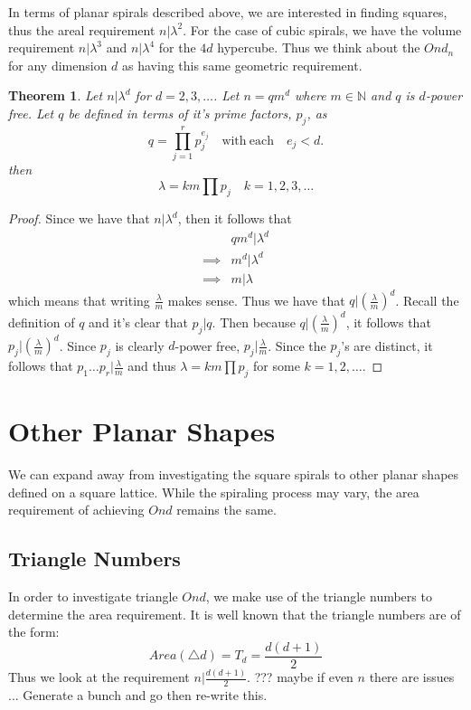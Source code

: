 \documentclass[11pt,reqno]{amsart}
\theoremstyle{mydef}
\newtheorem{thm}{Theorem}[section]
\begin{document}
In terms of planar spirals described above, we are interested
in finding squares, thus the areal requirement $n \vert \lambda^2$. For the case
of cubic spirals, we have the volume requirement $n \vert \lambda^3$ and $n 
\vert \lambda^4$ for the $4d$ hypercube. Thus we think about the $Ond_n$ for any 
dimension $d$ as having this same geometric requirement.

\begin{thm}
\label{dimdthm}
Let $n\vert \lambda^d$ for $d=2, 3, \ldots$. Let $n = qm^d$ where $m \in \mathbb{N}$ and $q$ is $d$-power 
free. Let $q$ be defined in terms of it's prime factors, $p_j$, as
\[
	q = \prod\limits_{j=1}^{r} p_j^{e_j}\quad \text{with}\ \text{each}\quad e_j < d.
\]
then
\[
	\lambda = k m \prod p_j \quad k = 1, 2, 3, \ldots
\]
\end{thm}

\begin{proof}
Since we have that $n \vert \lambda^d$, then it follows that
\begin{align*}
  & qm^d \vert \lambda^d\\
\implies & m^d \vert \lambda^d\\
\implies & m \vert \lambda 
\end{align*}
which means that writing $\frac{\lambda}{m}$ makes sense. Thus we have 
that $q \vert (\frac{\lambda}{m})^d$. Recall the definition of $q$ and it's clear
that $p_j \vert q$. Then because $q \vert (\frac{\lambda}{m})^d$, it follows that
$p_j \vert (\frac{\lambda}{m})^d$.  Since $p_j$ is clearly $d$-power free, $p_j \vert \frac{\lambda}{m}$.
Since the $p_j$'s are distinct, it follows that $p_1 \dots p_r \vert \frac{\lambda}{m}$ 
and thus $\lambda = k m \prod p_j$ for some $k = 1, 2, \ldots$.
\end{proof}

\section{Other Planar Shapes}

We can expand away from investigating the square spirals to other planar shapes
defined on a square lattice. While the spiraling process may vary, the area
requirement of achieving $Ond$ remains the same.

\subsection{Triangle Numbers}

In order to investigate triangle $Ond$, we make use of the triangle numbers \cite{TriangleNumbers}
to determine the area requirement. It is well known that the triangle numbers are of the form:
\[
	Area(\triangle d) =  T_d =  \frac{d(d+1)}{2}
\]
Thus we look at the requirement $n \vert \frac{d(d+1)}{2}$.  ??? maybe if even $n$ there are issues ... 
Generate a bunch and go then re-write this.
\end{document}
